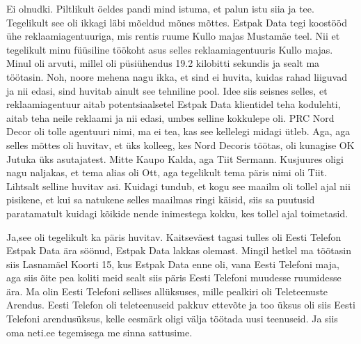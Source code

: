 Ei olnudki. Piltlikult öeldes pandi mind  istuma, et palun istu siia ja tee. 
Tegelikult  see oli ikkagi läbi mõeldud mõnes mõttes. Estpak Data tegi koostööd ühe reklaamiagentuuriga, mis rentis ruume Kullo majas 
Mustamäe teel. Nii et tegelikult minu füüsiline töökoht  asus selles 
reklaamiagentuuris Kullo majas. Minul oli arvuti, millel oli püsiühendus 19.2 
kilobitti sekundis ja sealt ma töötasin. Noh, noore mehena nagu ikka, et sind 
ei huvita, kuidas rahad liiguvad ja nii edasi,  sind huvitab ainult see 
tehniline pool. Idee siis seisnes selles, et reklaamiagentuur aitab 
potentsiaalsetel Estpak Data klientidel teha kodulehti, aitab teha neile 
reklaami ja nii edasi, umbes selline kokkulepe oli. PRC Nord Decor
oli tolle agentuuri nimi, ma ei tea, kas see kellelegi midagi ütleb. Aga, aga 
selles mõttes oli huvitav, et üks kolleeg, kes Nord Decoris töötas, oli kunagise 
OK Jutuka üks asutajatest. Mitte  
Kaupo Kalda, aga Tiit Sermann. Kusjuures oligi nagu naljakas, et tema alias oli Ott, aga tegelikult tema 
päris nimi oli Tiit. Lihtsalt selline huvitav asi. Kuidagi tundub, et kogu see 
maailm oli tollel ajal nii pisikene, et kui sa natukene selles maailmas ringi 
käisid, siis sa puutusid paratamatult kuidagi kõikide nende inimestega kokku, 
kes tollel ajal toimetasid.


Ja,see oli tegelikult ka päris huvitav. Kaitseväest tagasi tulles oli Eesti 
Telefon  Estpak Data ära söönud, Estpak 
Data lakkas olemast. Mingil hetkel ma töötasin siis Lasnamäel Koorti 15, kus 
Estpak Data enne oli, vana Eesti Telefoni maja, aga siis õite pea koliti meid 
sealt siis päris Eesti Telefoni muudesse ruumidesse ära. Ma olin Eesti Telefoni 
sellises allüksuses, mille pealkiri oli Teleteenuste Arendus.  Eesti Telefon 
oli teleteenuseid pakkuv ettevõte ja too üksus oli siis Eesti Telefoni 
arendusüksus, kelle eesmärk oligi välja töötada uusi teenuseid. Ja siis oma 
neti.ee tegemisega me sinna sattusime. 

